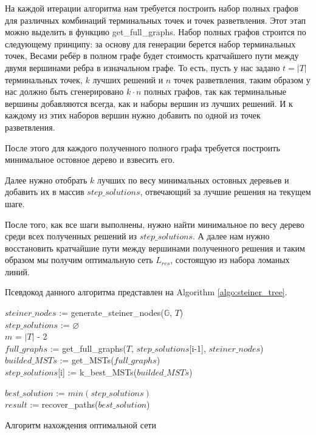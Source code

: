 На каждой итерации алгоритма нам требуется построить набор полных графов для различных комбинаций терминальных точек и точек разветвления. Этот этап можно выделить в функцию get\_full\_graphs. Набор полных графов строится по следующему принципу: за основу для генерации берется набор терминальных точек,  Весами ребёр в полном графе будет стоимость кратчайшего пути между двумя вершинами ребра в изначальном графе. То есть, пусть у нас задано $t = |T|$ терминальных точек, $k$ лучших решений и $n$ точек разветвления, таким образом у нас должно быть сгенерировано $k \cdot n$ полных графов, так как терминальные вершины добавляются всегда, как и наборы вершин из лучших решений. И к каждому из этих наборов вершин нужно добавить по одной из точек разветвления.

После этого для каждого полученного полного графа требуется построить минимальное остовное дерево и взвесить его.

Далее нужно отобрать $k$ лучших по весу минимальных остовных деревьев и добавить их в массив $step\_solutions$, отвечающий за лучшие решения на текущем шаге.

После того, как все шаги выполнены, нужно найти минимальное по весу дерево среди всех полученных решений из $step\_solutions$. А далее нам нужно восстановить кратчайшие пути между вершинами полученного решения и таким образом мы получим оптимальную сеть $L_{res}$, состоящую из набора ломаных линий.

Псевдокод данного алгоритма представлен на Algorithm \ref{algo:steiner_tree}.

\begin{algorithm}[H]
	\SetAlgoLined
	
	$steiner\_nodes$ := generate\_steiner\_nodes($\mathbb{G}$, $T$)\\
	$step\_solutions$ := $\varnothing$\\
	$m$ = $|T|$ - 2\\
	{
		$full\_graphs$ := get\_full\_graphs($T$, $step\_solutions$[i-1], $steiner\_nodes$)\\
		$builded\_MSTs$ := get\_MSTs($full\_graphs$)\\
		$step\_solutions$[i] := k\_best\_MSTs($builded\_MSTs$)		
	}
	
	$best\_solution$ := $min(step\_solutions)$\\
	$result$ := recover\_paths($best\_solution$)

\caption{Алгоритм нахождения оптимальной сети}
\label{algo:steiner_tree}
\end{algorithm}

